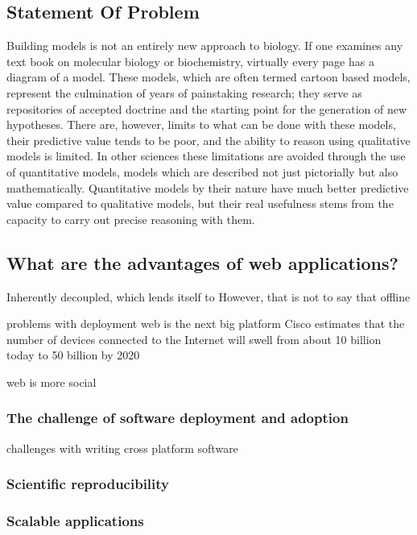 \subsection{Statement Of Problem}

Building models is not an entirely new approach to biology. If one
examines any text book on molecular biology or biochemistry, virtually
every page has a diagram of a model. These models, which are often
termed cartoon based models, represent the culmination of years of
painstaking research; they serve as repositories of accepted doctrine
and the starting point for the generation of new hypotheses. There are,
however, limits to what can be done with these models, their predictive
value tends to be poor, and the ability to reason using qualitative
models is limited. In other sciences these limitations are avoided
through the use of quantitative models, models which are described not
just pictorially but also mathematically. Quantitative models by their
nature have much better predictive value compared to qualitative models,
but their real usefulness stems from the capacity to carry out precise
reasoning with them.
\subsection{What are the advantages of web applications?}

Inherently decoupled, which lends itself to 
However, that is not to say that offline 

problems with deployment
web is the next big platform \autocite{o2007web}
Cisco estimates that the number of devices connected to the Internet will swell from about 10 billion today to 50 billion by 2020 \autocite{clark2014internet}

web is more social \autocite{dabbish2012social}

\subsubsection{The challenge of software deployment and adoption}
challenges with writing cross platform software \autocite{cusumano1999netscape}

\subsubsection{Scientific reproducibility}
\autocite{peng2011reproducible}

\subsubsection{Scalable applications}

